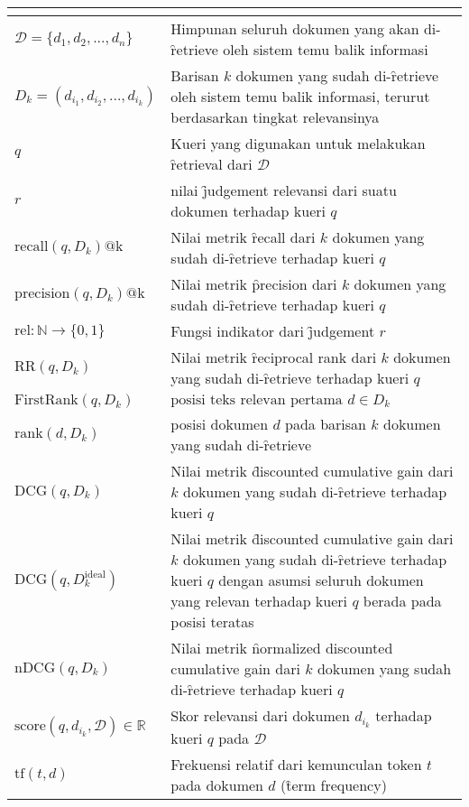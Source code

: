 \begin{longtable*}{| P{0.3\textwidth} |  P{0.7\textwidth} |}
      \\ \hline
     $\mathcal{D}= \{d_1, d_2, ..., d_n\}$ & Himpunan seluruh dokumen yang akan di-\f{retrieve} oleh sistem temu balik informasi \\ \hline
     $D_k = (d_{i_1}, d_{i_2}, ..., d_{i_k})$ & Barisan $k$ dokumen yang sudah di-\f{retrieve} oleh sistem temu balik informasi, terurut berdasarkan tingkat relevansinya \\ \hline
     $q$ & Kueri yang digunakan untuk melakukan \f{retrieval} dari $\mathcal{D}$ \\ \hline
     $r$ & nilai \f{judgement} relevansi dari suatu dokumen terhadap kueri $q$ \\ \hline
     $\text{recall}(q, D_k)\text{@k}$ & Nilai metrik \f{recall} dari $k$ dokumen yang sudah di-\f{retrieve} terhadap kueri $q$ \\ \hline
    $\text{precision}(q, D_k)\text{@k}$ & Nilai metrik \f{precision} dari $k$ dokumen yang sudah di-\f{retrieve} terhadap kueri $q$ \\ \hline
    $\text{rel}:\mathbb{N} \rightarrow \{0,1\}$ & Fungsi indikator dari \f{judgement} $r$ \\ \hline
    $\text{RR}(q, D_k)$ & Nilai metrik \f{reciprocal rank} dari $k$ dokumen yang sudah di-\f{retrieve} terhadap kueri $q$ \\ \hline
    $\text{FirstRank}(q, D_k)$ & $\text{posisi teks relevan pertama } d\in D_k$ \\ \hline
    $\text{rank}(d, D_k)$ & posisi dokumen $d$ pada barisan $k$ dokumen yang sudah di-\f{retrieve} \\ \hline
    $\text{DCG}(q, D_k)$ & Nilai metrik \f{discounted cumulative gain} dari $k$ dokumen yang sudah di-\f{retrieve} terhadap kueri $q$ \\ \hline
    $\text{DCG}(q, D_{k}^{\text{ideal}})$ & Nilai metrik \f{discounted cumulative gain} dari $k$ dokumen yang sudah di-\f{retrieve} terhadap kueri $q$ dengan asumsi seluruh dokumen yang relevan terhadap kueri $q$ berada pada posisi teratas \\ \hline
    $\text{nDCG}(q, D_k)$ & Nilai metrik \f{normalized discounted cumulative gain} dari $k$ dokumen yang sudah di-\f{retrieve} terhadap kueri $q$ \\ \hline
    $\text{score}(q, d_{i_k},\mathcal{D}) \in \mathbb{R}$ & Skor relevansi dari dokumen $d_{i_k}$ terhadap kueri $q$ pada $\mathcal{D}$ \\ \hline
    $\text{tf}(t, d)$ & Frekuensi relatif dari kemunculan token $t$ pada dokumen $d$ (\f{term frequency}) \\ \hline

\end{longtable*}
